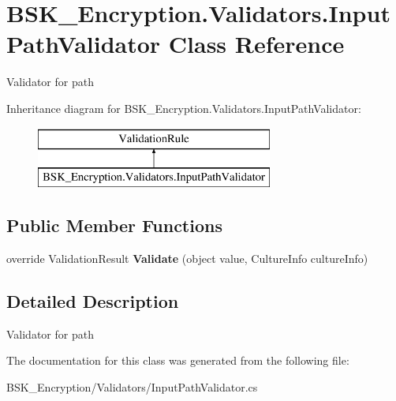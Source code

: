 \hypertarget{class_b_s_k___encryption_1_1_validators_1_1_input_path_validator}{}\section{B\+S\+K\+\_\+\+Encryption.\+Validators.\+Input\+Path\+Validator Class Reference}
\label{class_b_s_k___encryption_1_1_validators_1_1_input_path_validator}


Validator for path  


Inheritance diagram for B\+S\+K\+\_\+\+Encryption.\+Validators.\+Input\+Path\+Validator\+:\begin{figure}[H]
\begin{center}
\leavevmode
\includegraphics[height=2.000000cm]{class_b_s_k___encryption_1_1_validators_1_1_input_path_validator}
\end{center}
\end{figure}
\subsection*{Public Member Functions}
\begin{DoxyCompactItemize}
\item 
\mbox{\label{class_b_s_k___encryption_1_1_validators_1_1_input_path_validator_a124786fbed1512ca70b2e54e90cdb7e4}} 
override Validation\+Result {\bfseries Validate} (object value, Culture\+Info culture\+Info)
\end{DoxyCompactItemize}


\subsection{Detailed Description}
Validator for path 



The documentation for this class was generated from the following file\+:\begin{DoxyCompactItemize}
\item 
B\+S\+K\+\_\+\+Encryption/\+Validators/Input\+Path\+Validator.\+cs\end{DoxyCompactItemize}

